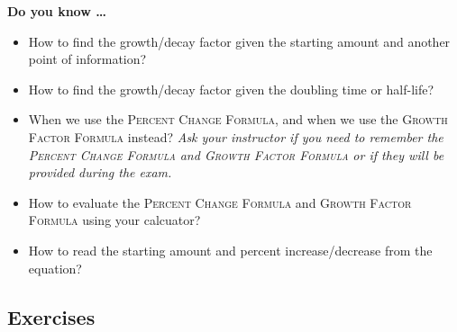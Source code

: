 
 

\noindent \textbf{Do you know \ldots}

\begin{itemize}
\item How to find the growth/decay factor given the starting amount and another point of information? 
\item How to find the growth/decay factor given the doubling time or half-life? 
\item When we use the \textsc{Percent Change Formula}, and when we use the \textsc{Growth Factor Formula} instead?  \emph{Ask your instructor if you need to remember the \textsc{Percent Change Formula} and \textsc{Growth Factor Formula} or if they will be provided during the exam.}
\item How to evaluate the \textsc{Percent Change Formula} and \textsc{Growth Factor Formula} using your calcuator? 
\item How to read the starting amount and percent increase/decrease from the equation? 
  
\end{itemize}

\subsection*{Exercises}

